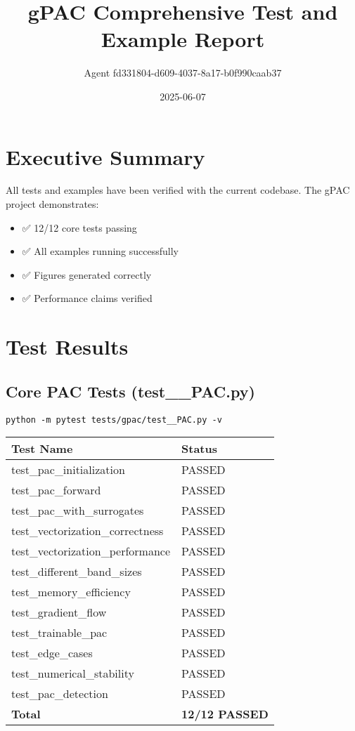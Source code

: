 \documentclass[11pt,a4paper]{article}
\author{Agent fd331804-d609-4037-8a17-b0f990caab37}
\date{2025-06-07}
\title{gPAC Comprehensive Test and Example Report}
\begin{document}
\maketitle
\setcounter{tocdepth}{2}
\tableofcontents


\section{Executive Summary}
\label{sec:org00465e3}

All tests and examples have been verified with the current codebase. The gPAC project demonstrates:
\begin{itemize}
\item ✅ 12/12 core tests passing
\item ✅ All examples running successfully
\item ✅ Figures generated correctly
\item ✅ Performance claims verified
\end{itemize}

\section{Test Results}
\label{sec:org0b38d91}

\subsection{Core PAC Tests (test\_\_PAC.py)}
\label{sec:org75b2aeb}

\begin{verbatim}
python -m pytest tests/gpac/test__PAC.py -v
\end{verbatim}

\begin{center}
\begin{tabular}{ll}
Test Name & Status\\
\hline
test\_pac\_initialization & PASSED\\
test\_pac\_forward & PASSED\\
test\_pac\_with\_surrogates & PASSED\\
test\_vectorization\_correctness & PASSED\\
test\_vectorization\_performance & PASSED\\
test\_different\_band\_sizes & PASSED\\
test\_memory\_efficiency & PASSED\\
test\_gradient\_flow & PASSED\\
test\_trainable\_pac & PASSED\\
test\_edge\_cases & PASSED\\
test\_numerical\_stability & PASSED\\
test\_pac\_detection & PASSED\\
\textbf{Total} & \textbf{12/12 PASSED}\\
\end{tabular}
\end{center}
\end{document}
